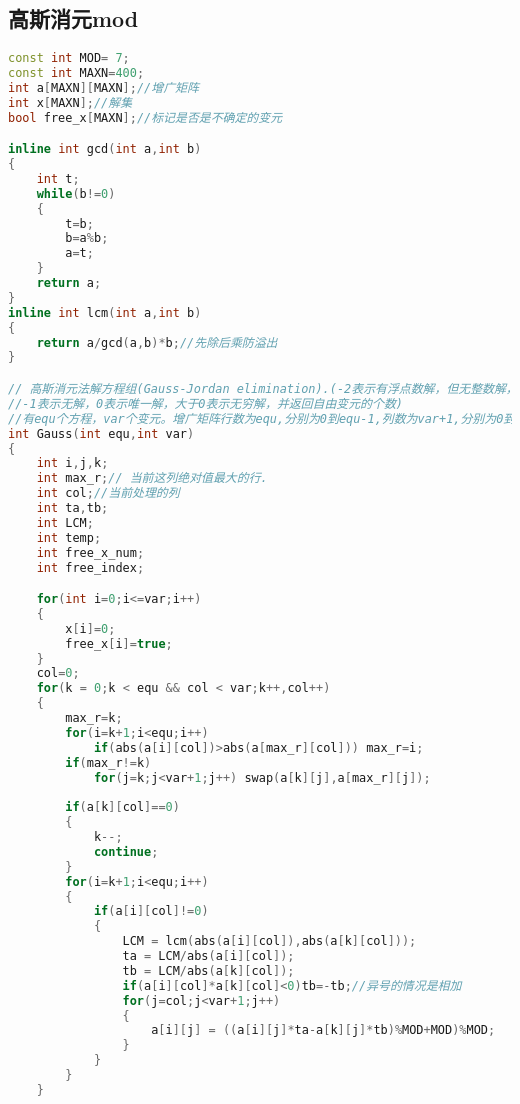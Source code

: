 \subsection{高斯消元mod}
\begin{lstlisting}[language=C++]
const int MOD= 7;
const int MAXN=400;
int a[MAXN][MAXN];//增广矩阵
int x[MAXN];//解集
bool free_x[MAXN];//标记是否是不确定的变元

inline int gcd(int a,int b)
{
    int t;
    while(b!=0)
    {
        t=b;
        b=a%b;
        a=t;
    }
    return a;
}
inline int lcm(int a,int b)
{
    return a/gcd(a,b)*b;//先除后乘防溢出
}

// 高斯消元法解方程组(Gauss-Jordan elimination).(-2表示有浮点数解，但无整数解，
//-1表示无解，0表示唯一解，大于0表示无穷解，并返回自由变元的个数)
//有equ个方程，var个变元。增广矩阵行数为equ,分别为0到equ-1,列数为var+1,分别为0到var.
int Gauss(int equ,int var)
{
    int i,j,k;
    int max_r;// 当前这列绝对值最大的行.
    int col;//当前处理的列
    int ta,tb;
    int LCM;
    int temp;
    int free_x_num;
    int free_index;

    for(int i=0;i<=var;i++)
    {
        x[i]=0;
        free_x[i]=true;
    }
    col=0; 
    for(k = 0;k < equ && col < var;k++,col++)
    {
        max_r=k;
        for(i=k+1;i<equ;i++)
        	if(abs(a[i][col])>abs(a[max_r][col])) max_r=i;
        if(max_r!=k)
        	for(j=k;j<var+1;j++) swap(a[k][j],a[max_r][j]);
        
        if(a[k][col]==0)
        {
            k--;
            continue;
        }
        for(i=k+1;i<equ;i++)
        {
            if(a[i][col]!=0)
            {
                LCM = lcm(abs(a[i][col]),abs(a[k][col]));
                ta = LCM/abs(a[i][col]);
                tb = LCM/abs(a[k][col]);
                if(a[i][col]*a[k][col]<0)tb=-tb;//异号的情况是相加
                for(j=col;j<var+1;j++)
                {
                    a[i][j] = ((a[i][j]*ta-a[k][j]*tb)%MOD+MOD)%MOD;
                }
            }
        }
    }



\end{lstlisting}

